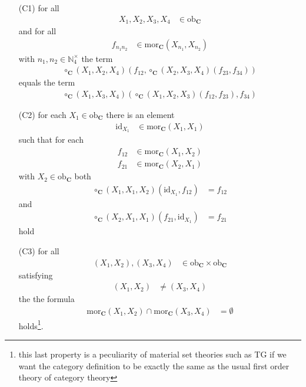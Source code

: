 \begin{enumerate}
\item[(C1)]
for all
\begin{align*}
  X_{1},X_{2},X_{3},X_{4}
  &\in
  \mathrm{ob}_{\mathbf{C}}
\end{align*}  
and for all
\begin{align*}
  f_{n_{1}n_{2}}
  &\in
  \mathrm{mor}_{\mathbf{C}}(X_{n_{1}},X_{n_{2}})
\end{align*}
with $n_{1},n_{2} \in \mathbb{N}_{4}^{\times}$ the term
\begin{align*}
  \circ_{\mathbf{C}}
  (X_{1},X_{2},X_{4})
  \left(
    f_{12},
    \circ_{\mathbf{C}}
    (X_{2},X_{3},X_{4})
    (f_{23},f_{34})
  \right)
\end{align*}
equals the term
\begin{align*}
  \circ_{\mathbf{C}}
  (X_{1},X_{3},X_{4})
  \left(
    \circ_{\mathbf{C}}
    (X_{1},X_{2},X_{3})
    (f_{12},f_{23}),
    f_{34}
  \right)
\end{align*}
\item[(C2)]
for each $X_{1} \in \mathrm{ob}_{\mathbf{C}}$ there is an element
\begin{align*}
  \mathrm{id}_{X_{1}}
  &\in
  \mathrm{mor}_{\mathbf{C}}(X_{1},X_{1})
\end{align*}
such that for each
\begin{align*}
  f_{12}
  &\in
  \mathrm{mor}_{\mathbf{C}}(X_{1},X_{2})
  \\
  f_{21}
  &\in
  \mathrm{mor}_{\mathbf{C}}(X_{2},X_{1})
\end{align*}
with $X_{2} \in \mathrm{ob}_{\mathbf{C}}$ both
\begin{align*}
  \circ_{\mathbf{C}}
  (X_{1},X_{1},X_{2})
  (\mathrm{id}_{X_{1}},f_{12})
  &=
  f_{12}
\end{align*}
and
\begin{align*}
  \circ_{\mathbf{C}}
  (X_{2},X_{1},X_{1})
  (f_{21},\mathrm{id}_{X_{1}})
  &=
  f_{21}
\end{align*}
hold
\item[(C3)]
for all
\begin{align*}
  (X_{1},X_{2}),(X_{3},X_{4})
  &\in
  \mathrm{ob}_{\mathbf{C}}
  \times
  \mathrm{ob}_{\mathbf{C}}
\end{align*}
satisfying
\begin{align*}
  (X_{1},X_{2})
  &\neq
  (X_{3},X_{4})
\end{align*}
the the formula
\begin{align*}
  \mathrm{mor}_{\mathbf{C}}(X_{1},X_{2})
  \cap
  \mathrm{mor}_{\mathbf{C}}(X_{3},X_{4})
  &=
  \emptyset
\end{align*}
holds\footnote{this last property is a peculiarity of material set theories such as TG if we want the category definition to be exactly the same as the usual first order theory of category theory}.
\end{enumerate}
